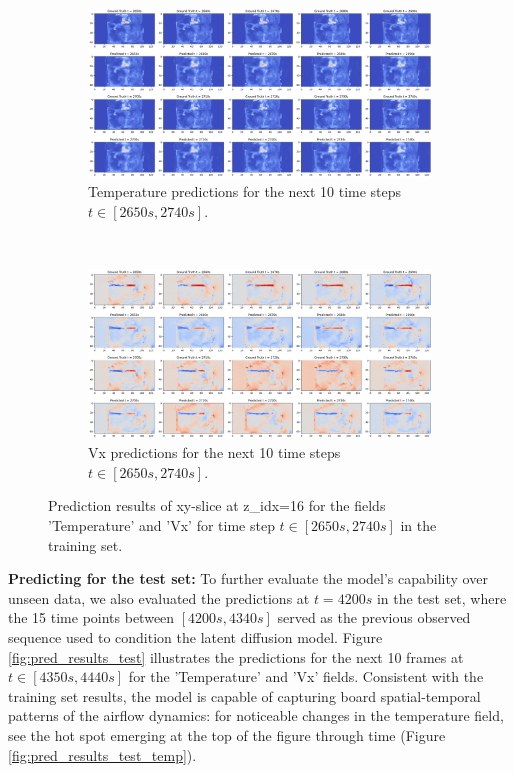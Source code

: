 \documentclass[final-report]{article-template}
\begin{document}
\begin{figure}[!htb]
    \centering
    \begin{subfigure}[t]{0.99\textwidth}
        \centering
        \includegraphics[width=\textwidth]{figures/temp_10_2650.png}
        \caption{Temperature predictions for the next 10 time steps $t \in [2650s, 2740s]$.}
    \end{subfigure} \\[8mm]
    \begin{subfigure}[t]{0.99\textwidth}
        \centering
        \includegraphics[width=\textwidth]{figures/vx_10_2650.png}
        \caption{Vx predictions for the next 10 time steps $t \in [2650s, 2740s]$.}
    \end{subfigure}
    \caption{Prediction results of xy-slice at z\_idx=16 for the fields 'Temperature' and 'Vx' for time step $t \in [2650s, 2740s]$ in the training set.}
    \label{fig:pred_results_training}
\end{figure}
\newpage
\textbf{Predicting for the test set:} To further evaluate the model's capability over unseen data, we also evaluated the predictions at $t = 4200s$ in the test set, where the 15 time points between $[4200s, 4340s]$ served as the previous observed sequence used to condition the latent diffusion model. Figure \ref{fig:pred_results_test} illustrates the predictions for the next 10 frames at $t \in [4350s, 4440s]$ for the 'Temperature' and 'Vx' fields. Consistent with the training set results, the model is capable of capturing board spatial-temporal patterns of the airflow dynamics: for noticeable changes in the temperature field, see the hot spot emerging at the top of the figure through time (Figure \ref{fig:pred_results_test_temp}).
\end{document}

